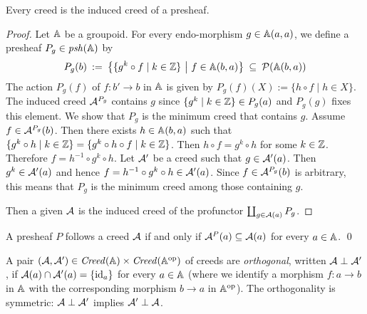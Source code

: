 \begin{proposition}
    Every creed is the induced creed of a presheaf.
\end{proposition}
\begin{proof}
    Let \( \mathbb{A} \) be a groupoid.
    For every endo-morphism \( g \in \mathbb{A}(a,a) \), we define a presheaf \( P_g \in \mathit{psh}(\mathbb{A}) \) by
    \begin{equation*}
        P_g(b)
        \::=\:
        \big\{ \{ g^k \circ f \mid k \in \mathbb{Z} \} ~\big|~ f \in \mathbb{A}(b,a) \big\}
        \:\subseteq\:
        \mathcal{P}(\mathbb{A}(b,a))
    \end{equation*}
    The action \( P_g(f) \) of \( f \colon b' \to b \) in \( \mathbb{A} \) is given by \( P_g(f)(X) := \{ h \circ f \mid h \in X \} \).
    The induced creed \( \mathcal{A}^{P_g} \) contains \( g \) since \( \{ g^k \mid k \in \mathbb{Z} \} \in P_g(a) \) and \( P_g(g) \) fixes this element.
    We show that \( P_g \) is the minimum creed that contains \( g \).
    Assume \( f \in \mathcal{A}^{P_g}(b) \).
    Then there exists \( h \in \mathbb{A}(b,a) \) such that \( \{ g^k \circ h \mid k \in \mathbb{Z} \} = \{ g^k \circ h \circ f \mid k \in \mathbb{Z} \} \).
    Then \( h \circ f = g^k \circ h \) for some \( k \in \mathbb{Z} \).
    Therefore \( f = h^{-1} \circ g^k \circ h \).
    Let \( \mathcal{A}' \) be a creed such that \( g \in \mathcal{A}'(a) \).
    Then \( g^k \in \mathcal{A}'(a) \) and hence \( f = h^{-1} \circ g^k \circ h \in \mathcal{A}'(a) \).
    Since \( f \in \mathcal{A}^{P_g}(b) \) is arbitrary, this means that \( P_g \) is the minimum creed among those containing \( g \).

    Then a given \( \mathcal{A} \) is the induced creed of the profunctor \( \coprod_{g \in \mathcal{A}(a)} P_g \).
\end{proof}

\begin{definition}
    A presheaf \( P \) follows a creed \( \mathcal{A} \) if and only if \( \mathcal{A}^P(a) \subseteq \mathcal{A}(a) \) for every \( a \in \mathbb{A} \).
    \qed
\end{definition}

A pair \( (\mathcal{A}, \mathcal{A}') \in \mathit{Creed}(\mathbb{A}) \times \mathit{Creed}(\mathbb{A}^{\mathrm{op}}) \) of creeds are \emph{orthogonal}, written \( \mathcal{A} \mathrel{\bot} \mathcal{A}' \), if \( \mathcal{A}(a) \cap \mathcal{A}'(a) = \{ \mathrm{id}_a \} \) for every \( a \in \mathbb{A} \) (where we identify a morphism \( f \colon a \longrightarrow b \) in \( \mathbb{A} \) with the corresponding morphism \( b \longrightarrow a \) in \( \mathbb{A}^{\mathrm{op}} \)).
The orthogonality is symmetric: \( \mathcal{A} \mathrel{\bot} \mathcal{A}' \) implies \( \mathcal{A}' \mathrel{\bot} \mathcal{A} \).

